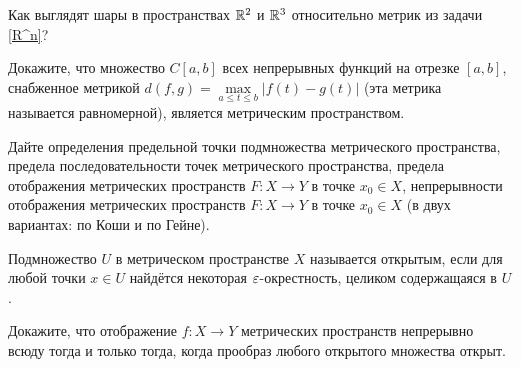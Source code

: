 \documentclass[a4paper,12pt]{article}
\begin{document}
Как выглядят шары в пространствах $\mathbb{R}^2$ и $\mathbb{R}^3$ относительно метрик из
задачи \ref{R^n}?




Докажите, что множество $C[a,b]$ всех непрерывных функций на отрезке
$[a,b]$, снабженное метрикой $d(f,g)=\max\limits_{a\le t\le
b}|f(t)-g(t)|$ (эта метрика называется  равномерной), является метрическим пространством.

Дайте определения предельной точки подмножества метрического
пространства, предела последовательности точек метрического
пространства, предела отображения метрических пространств $F:X\to Y$ в
точке $x_0\in X$, непрерывности отображения метрических пространств
$F:X\to Y$ в точке $x_0\in X$ (в двух вариантах: по Коши и по Гейне).

Подмножество $U$ в метрическом пространстве $X$ называется  открытым, если для любой точки $x\in U$ найдётся некоторая $\varepsilon$-окрестность, целиком содержащаяся в $U$.

Докажите, что отображение $f\colon X \to Y$ метрических пространств непрерывно всюду тогда и только тогда, когда прообраз любого открытого множества открыт.

\end{document}
